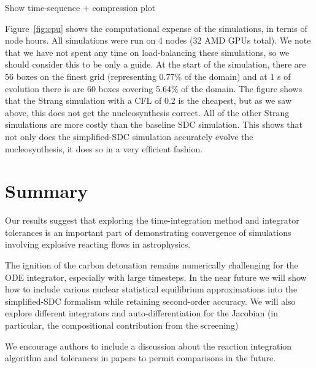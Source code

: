 \documentclass[linenumbers,trackchanges]{aastex631}
\newcommand{\MarginPar}[1]{
    \marginpar{\vskip-\baselineskip%
               \raggedright%
               \tiny\sffamily%
               {\color{red}\hrule%
               \smallskip%
               #1\par%
               \smallskip%
               \hrule}}%
}
\begin{document}
Show time-sequence + compression plot

Figure~\ref{fig:cpu} shows the computational expense of the
simulations, in terms of node hours.  All simulations were run on 4
nodes (32 AMD GPUs total).  We note that we have not spent any time on
load-balancing these simulations, so we should consider this to be
only a guide.  At the start of the simulation, there are 56 boxes on
the finest grid (representing 0.77\% of the domain) and at 1 s of
evolution there is are 60 boxes covering 5.64\% of the domain.  The
figure shows that the Strang simulation with a CFL of 0.2 is the
cheapest, but as we saw above, this does not get the nucleosynthesis
correct.  All of the other Strang simulations are more costly than the
baseline SDC simulation.  This shows that not only does the
simplified-SDC simulation accurately evolve the nucleosynthesis, it
does so in a very efficient fashion.

\section{Summary}

Our results suggest that exploring the time-integration method and
integrator tolerances is an important part of demonstrating
convergence of simulations involving explosive reacting flows in
astrophysics.

The ignition of the carbon detonation remains numerically challenging
for the ODE integrator, especially with large
timesteps.  \MarginPar{add some info on why it fails} In the near
future we will show how to include various nuclear statistical
equilibrium approximations into the simplified-SDC formalism while
retaining second-order accuracy.  We will also explore different
integrators and auto-differentiation for the Jacobian (in particular,
the compositional contribution from the screening)

We encourage authors to include a discussion about the reaction
integration algorithm and tolerances in papers to permit comparisons
in the future.
\end{document}
